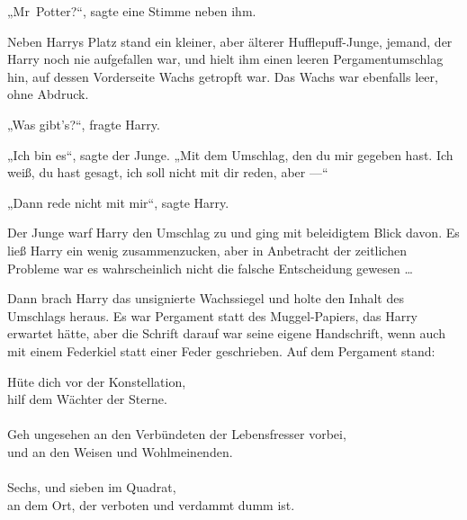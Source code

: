 „Mr~Potter?“, sagte eine Stimme neben ihm.

Neben Harrys Platz stand ein kleiner, aber älterer Hufflepuff-Junge, jemand, der Harry noch nie aufgefallen war, und hielt ihm einen leeren Pergamentumschlag hin, auf dessen Vorderseite Wachs getropft war. Das Wachs war ebenfalls leer, ohne Abdruck.

„Was gibt’s?“, fragte Harry.

„Ich bin es“, sagte der Junge.
„Mit dem Umschlag, den du mir gegeben hast. Ich weiß, du hast gesagt, ich soll nicht mit dir reden, aber —“

„Dann rede nicht mit mir“, sagte Harry.

Der Junge warf Harry den Umschlag zu und ging mit beleidigtem Blick davon. Es ließ Harry ein wenig zusammenzucken, aber in Anbetracht der zeitlichen Probleme war es wahrscheinlich nicht die falsche Entscheidung gewesen …

Dann brach Harry das unsignierte Wachssiegel und holte den Inhalt des Umschlags heraus. Es war Pergament statt des Muggel-Papiers, das Harry erwartet hätte, aber die Schrift darauf war seine eigene Handschrift, wenn auch mit einem Federkiel statt einer Feder geschrieben. Auf dem Pergament stand:

\begin{writtenNote}
Hüte dich vor der Konstellation,\\
hilf dem Wächter der Sterne.\\
\\
Geh ungesehen an den Verbündeten der Lebensfresser vorbei,\\
und an den Weisen und Wohlmeinenden.\\
\\
Sechs, und sieben im Quadrat,\\
an dem Ort, der verboten und verdammt dumm ist.
\end{writtenNote}

